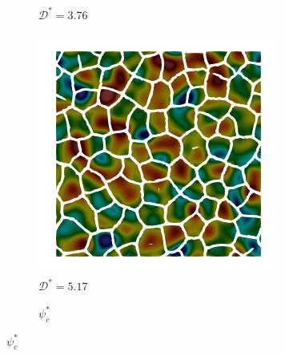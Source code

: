 \begin{figure}[!htbp]
\begin{subfigure}[b]{0.25\textwidth}
    \caption{$\mathcal{D}^* = 3.76$}
    \label{fig: Chapter4/2D/psic_sqexp_cartesian_5_5_rho_0_seed_a_with_crack_160}
  \end{subfigure}
  \begin{subfigure}[b]{0.25\textwidth}
    \includegraphics[width=\textwidth]{Chapter4/figures/2D/psic_sqexp_cartesian_5_5_rho_0_seed_a_with_crack_220.png}
    \caption{$\mathcal{D}^* = 5.17$}
    \label{fig: Chapter4/2D/psic_sqexp_cartesian_5_5_rho_0_seed_a_with_crack_220}
  \end{subfigure}
  \begin{subfigure}[b]{0.08\textwidth}
    \caption*{$\psi_c^*$}

\end{subfigure}
\end{figure}
